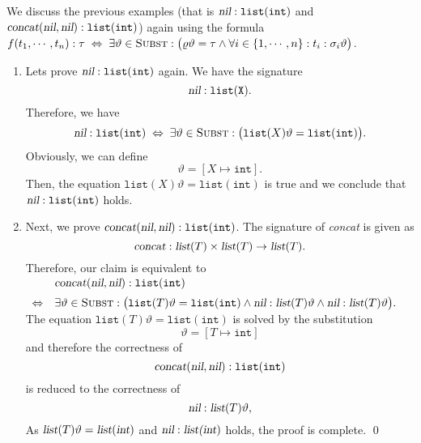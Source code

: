 \examplesEng
We discuss the previous examples (that is $\textsl{nil}: \mathtt{list(int)}$ and
$\textsl{concat}(\textsl{nil}, \textsl{nil}): \mathtt{list(int)}$) 
again using the formula
\\[0.2cm]
\hspace*{1.3cm}
$f(t_1,\cdots,t_n): \tau \;\Leftrightarrow\; 
 \exists \vartheta \in \textsc{Subst}: \bigl(\varrho \vartheta = \tau \wedge 
 \forall i \in \{1,\cdots,n\}: t_i : \sigma_i \vartheta \bigr)
$.
\begin{enumerate}
\item Lets prove $\textsl{nil}: \mathtt{list(int)}$ again.  We have the signature
      \[ \textsl{nil}: \mathtt{list(X)}. \]
      Therefore, we have
      \[ \textsl{nil}: \mathtt{list(int)} \;\Leftrightarrow\; 
         \exists \vartheta \in \textsc{Subst}: \bigl(\mathtt{list}(X) \vartheta = \mathtt{list(int)}  \bigr).
      \]
      Obviously, we can define 
      \[ \vartheta = [ X \mapsto \mathtt{int} ]. \]
      Then, the equation $\mathtt{list}(X) \vartheta = \mathtt{list(int)}$ is true and we
      conclude that $\textsl{nil}: \mathtt{list(int)}$ holds. 
\item Next, we prove $\textsl{concat}(\textsl{nil}, \textsl{nil}): \mathtt{list(int)}$.
      The signature of \textsl{concat} is given as
      \[ \textsl{concat}: \textsl{list}(T) \times \textsl{list}(T) \rightarrow \textsl{list}(T). \]
      Therefore, our claim is equivalent to
      \\[0.2cm]
      \hspace*{1.3cm}
      $
      \begin{array}{cl}
                        & \textsl{concat}(\textsl{nil},\textsl{nil}): \mathtt{list(int)} \\[0.2cm]
       \Leftrightarrow  & \exists \vartheta \in \textsc{Subst}: \bigl(\mathtt{list}(T) \vartheta = \mathtt{list(int)}
                          \wedge \textsl{nil} : \textsl{list}(T) \vartheta \wedge \textsl{nil} : \textsl{list}(T)
                          \vartheta \bigr).
      \end{array}
      $
      \\[0.2cm]
      The equation $\mathtt{list}(T) \vartheta = \mathtt{list(int)}$ is solved by the substitution
      \[ \vartheta = [ T \mapsto \mathtt{int} ] \]
      and therefore the correctness of 
      \[ \textsl{concat}(\textsl{nil},\textsl{nil}): \mathtt{list(int)} \]
      is reduced to the correctness of
      \[ \textsl{nil} : \textsl{list}(T) \vartheta,  \]      
      As $\textsl{list}(T) \vartheta = \textsl{list}(\textsl{int})$ and 
      $\textsl{nil} : \textsl{list(int})$ holds, the proof is complete. \qed
\end{enumerate}


